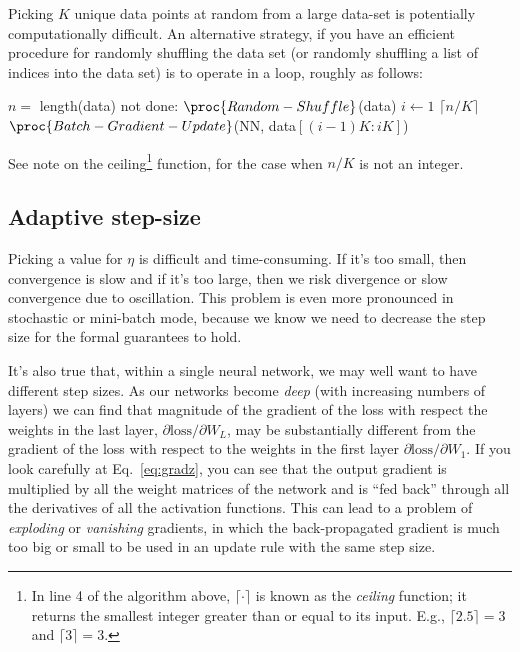 Picking $K$ unique data points at random from a large data-set is
potentially computationally difficult.  An alternative strategy, if
you have an efficient procedure for randomly shuffling the data set
(or randomly shuffling a list of indices into the data set) is to
operate in a loop, roughly as follows:

\begin{codebox}
  \li     $n = $ length(data)
  \li     \While not done:
  \Do
  \li        $\proc{Random-Shuffle}$(data)
  \li        \For $i \gets 1$ \To $\lceil n/K \rceil$
  \Do
  \li           $\proc{Batch-Gradient-Update}$(NN, data$[(i - 1)K:iK]$)
  \End
  \End
\end{codebox}
See note on the ceiling\footnote{
  In line 4 of the algorithm above, $\lceil \cdot \rceil$ is known
  as the \emph{ceiling} function; it returns the smallest
  integer greater than or equal to its input. E.g., $\lceil 2.5 \rceil = 3$ and $\lceil 3 \rceil = 3$.}
function, for the case when $n/K$ is not an integer.

\subsection{Adaptive step-size}
Picking a value for $\eta$ is difficult and time-consuming.  If it's
too small, then convergence is slow and if it's too large, then we
risk divergence or slow convergence due to oscillation.  This problem
is even more pronounced in stochastic or mini-batch mode, because we
know we need to decrease the step size for the formal guarantees to
hold.

It's also true that, within a single neural network, we may well want
to have different step sizes.  As our networks become {\em deep} (with
increasing numbers of layers) we can find that magnitude of the
gradient of the loss with respect the weights in the last layer,
$\partial \text{loss} / \partial W_L$, may be substantially
different from the gradient of the loss with respect to the weights in
the first layer $\partial \text{loss} / \partial W_1$.  If you look
carefully at Eq.~\ref{eq:gradz}, you can see that the output
gradient is multiplied by all the weight matrices of the network and
is ``fed back'' through all the derivatives of all the activation
functions.  This can lead to a problem of {\em exploding}  or {\em
    vanishing} gradients, in which the back-propagated gradient is much
too big or small to be used in an update rule with the same step size.

